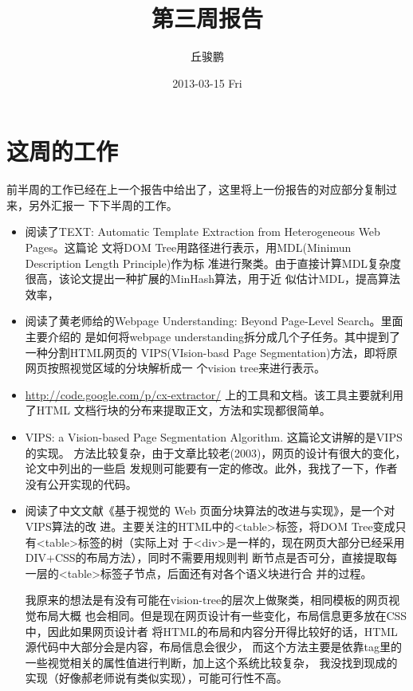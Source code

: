 \documentclass[a4paper]{article}
\title{第三周报告}
\author{丘骏鹏}
\date{2013-03-15 Fri}
\begin{document}
\maketitle



\section{这周的工作}
\label{sec-1}

前半周的工作已经在上一个报告中给出了，这里将上一份报告的对应部分复制过来，另外汇报一
下下半周的工作。

\begin{itemize}
\item 阅读了TEXT: Automatic Template Extraction from Heterogeneous Web Pages。这篇论
  文将DOM Tree用路径进行表示，用MDL(Minimun Description Length Principle)作为标
  准进行聚类。由于直接计算MDL复杂度很高，该论文提出一种扩展的MinHash算法，用于近
  似估计MDL，提高算法效率，
\item 阅读了黄老师给的Webpage Understanding: Beyond Page-Level Search。里面主要介绍的
  是如何将webpage understanding拆分成几个子任务。其中提到了一种分割HTML网页的
  VIPS(VIsion-basd Page Segmentation)方法，即将原网页按照视觉区域的分块解析成一
  个vision tree来进行表示。
\item \href{http://code.google.com/p/cx-extractor/}{http://code.google.com/p/cx-extractor/} 上的工具和文档。该工具主要就利用了HTML
  文档行块的分布来提取正文，方法和实现都很简单。
\item VIPS: a Vision-based Page Segmentation Algorithm. 这篇论文讲解的是VIPS的实现。
  方法比较复杂，由于文章比较老(2003)，网页的设计有很大的变化，论文中列出的一些启
  发规则可能要有一定的修改。此外，我找了一下，作者没有公开实现的代码。
\item 阅读了中文文献《基于视觉的 Web 页面分块算法的改进与实现》，是一个对VIPS算法的改
  进。主要关注的HTML中的<table>标签，将DOM Tree变成只有<table>标签的树（实际上对
  于<div>是一样的，现在网页大部分已经采用DIV+CSS的布局方法），同时不需要用规则判
  断节点是否可分，直接提取每一层的<table>标签子节点，后面还有对各个语义块进行合
  并的过程。
  
  我原来的想法是有没有可能在vision-tree的层次上做聚类，相同模板的网页视觉布局大概
  也会相同。但是现在网页设计有一些变化，布局信息更多放在CSS中，因此如果网页设计者
  将HTML的布局和内容分开得比较好的话，HTML源代码中大部分会是内容，布局信息会很少，
  而这个方法主要是依靠tag里的一些视觉相关的属性值进行判断，加上这个系统比较复杂，
  我没找到现成的实现（好像郝老师说有类似实现），可能可行性不高。
\end{itemize}
\end{document}

